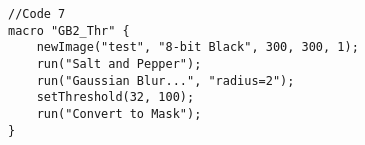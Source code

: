 \begin{lstlisting}
//Code 7
macro "GB2_Thr" {
	newImage("test", "8-bit Black", 300, 300, 1);
	run("Salt and Pepper");
	run("Gaussian Blur...", "radius=2");
	setThreshold(32, 100);
	run("Convert to Mask");
}






\end{lstlisting}
